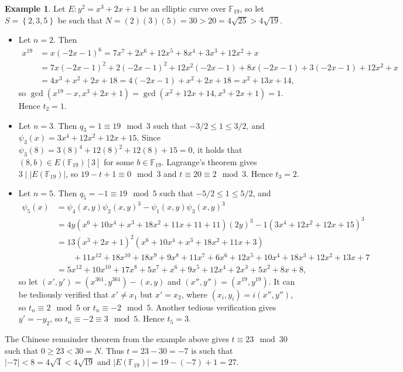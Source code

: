 \documentclass{article}
\newcommand{\F}{\mathbb{F}}
\newcommand{\rb}[1]{\left( #1 \right)}
\renewcommand{\sb}[1]{\left[ #1 \right]}
\newcommand{\cb}[1]{\left\{ #1 \right\}}
\newcommand{\abs}[1]{\left\lvert #1 \right\rvert}
\theoremstyle{definition}
\newtheorem*{example}{Example}
\begin{document}
\begin{example}
Let $ E : y^2 = x^3 + 2x + 1 $ be an elliptic curve over $ \F_{19} $, so let $ S = \cb{2, 3, 5} $ be such that $ N = \rb{2}\rb{3}\rb{5} = 30 > 20 = 4\sqrt{25} > 4\sqrt{19} $.
\begin{itemize}
\item Let $ n = 2 $. Then
\begin{align*}
x^{19}
& = x\rb{-2x - 1}^6
= 7x^7 + 2x^6 + 12x^5 + 8x^4 + 3x^3 + 12x^2 + x \\
& = 7x\rb{-2x - 1}^2 + 2\rb{-2x - 1}^2 + 12x^2\rb{-2x - 1} + 8x\rb{-2x - 1} + 3\rb{-2x - 1} + 12x^2 + x \\
& = 4x^3 + x^2 + 2x + 18
= 4\rb{-2x - 1} + x^2 + 2x + 18
= x^2 + 13x + 14,
\end{align*}
so $ \gcd\rb{x^{19} - x, x^3 + 2x + 1} = \gcd\rb{x^2 + 12x + 14, x^3 + 2x + 1} = 1 $. Hence $ t_2 = 1 $.
\item Let $ n = 3 $. Then $ q_3 = 1 \equiv 19 \mod 3 $ such that $ -3 / 2 \le 1 \le 3 / 2 $, and $ \psi_3\rb{x} = 3x^4 + 12x^2 + 12x + 15 $. Since $ \psi_3\rb{8} = 3\rb{8}^4 + 12\rb{8}^2 + 12\rb{8} + 15 = 0 $, it holds that $ \rb{8, b} \in E\rb{\F_{19}}\sb{3} $ for some $ b \in \F_{19} $. Lagrange's theorem gives $ 3 \mid \abs{E\rb{\F_{19}}} $, so $ 19 - t + 1 \equiv 0 \mod 3 $ and $ t \equiv 20 \equiv 2 \mod 3 $. Hence $ t_3 = 2 $.
\item Let $ n = 5 $. Then $ q_5 = -1 \equiv 19 \mod 5 $ such that $ -5 / 2 \le 1 \le 5 / 2 $, and
\begin{align*}
\psi_5\rb{x}
& = \psi_4\rb{x, y}\psi_2\rb{x, y}^3 - \psi_1\rb{x, y}\psi_3\rb{x, y}^3 \\
& = 4y\rb{x^6 + 10x^4 + x^3 + 18x^2 + 11x + 11 + 11}\rb{2y}^3 - 1\rb{3x^4 + 12x^2 + 12x + 15}^3 \\
& = 13\rb{x^3 + 2x + 1}^2\rb{x^6 + 10x^4 + x^3 + 18x^2 + 11x + 3} \\
& \qquad + 11x^{12} + 18x^{10} + 18x^9 + 9x^8 + 11x^7 + 6x^6 + 12x^5 + 10x^4 + 18x^3 + 12x^2 + 13x + 7 \\
& = 5x^{12} + 10x^{10} + 17x^8 + 5x^7 + x^6 + 9x^5 + 12x^4 + 2x^3 + 5x^2 + 8x + 8,
\end{align*}
so let $ \rb{x', y'} = \rb{x^{361}, y^{361}} - \rb{x, y} $ and $ \rb{x'', y''} = \rb{x^{19}, y^{19}} $. It can be tediously verified that $ x' \ne x_1 $ but $ x' = x_2 $, where $ \rb{x_i, y_i} = i\rb{x'', y''} $, so $ t_n \equiv 2 \mod 5 $ or $ t_n \equiv -2 \mod 5 $. Another tedious verification gives $ y' = -y_2 $, so $ t_n \equiv -2 \equiv 3 \mod 5 $. Hence $ t_5 = 3 $.
\end{itemize}
The Chinese remainder theorem from the example above gives $ t \equiv 23 \mod 30 $ such that $ 0 \ge 23 < 30 = N $. Thus $ t = 23 - 30 = -7 $ is such that $ \abs{-7} < 8 = 4\sqrt{4} < 4\sqrt{19} $ and $ \abs{E\rb{\F_{19}}} = 19 - \rb{-7} + 1 = 27 $.
\end{example}
\end{document}
